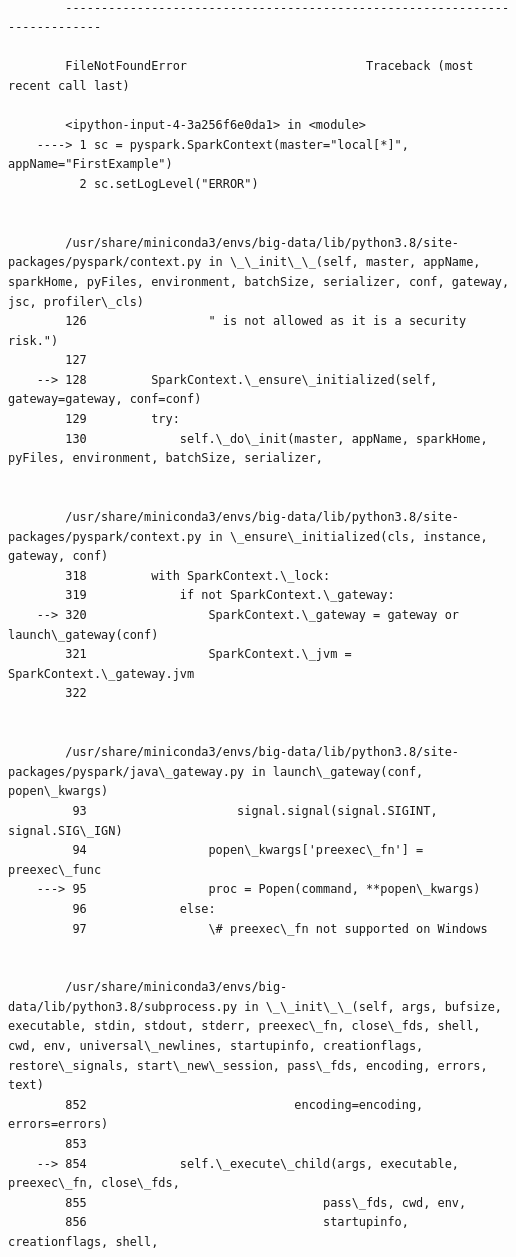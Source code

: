\documentclass[11pt]{article}
\begin{document}
    \begin{Verbatim}[commandchars=\\\{\}]

        ---------------------------------------------------------------------------

        FileNotFoundError                         Traceback (most recent call last)

        <ipython-input-4-3a256f6e0da1> in <module>
    ----> 1 sc = pyspark.SparkContext(master="local[*]", appName="FirstExample")
          2 sc.setLogLevel("ERROR")


        /usr/share/miniconda3/envs/big-data/lib/python3.8/site-packages/pyspark/context.py in \_\_init\_\_(self, master, appName, sparkHome, pyFiles, environment, batchSize, serializer, conf, gateway, jsc, profiler\_cls)
        126                 " is not allowed as it is a security risk.")
        127 
    --> 128         SparkContext.\_ensure\_initialized(self, gateway=gateway, conf=conf)
        129         try:
        130             self.\_do\_init(master, appName, sparkHome, pyFiles, environment, batchSize, serializer,


        /usr/share/miniconda3/envs/big-data/lib/python3.8/site-packages/pyspark/context.py in \_ensure\_initialized(cls, instance, gateway, conf)
        318         with SparkContext.\_lock:
        319             if not SparkContext.\_gateway:
    --> 320                 SparkContext.\_gateway = gateway or launch\_gateway(conf)
        321                 SparkContext.\_jvm = SparkContext.\_gateway.jvm
        322 


        /usr/share/miniconda3/envs/big-data/lib/python3.8/site-packages/pyspark/java\_gateway.py in launch\_gateway(conf, popen\_kwargs)
         93                     signal.signal(signal.SIGINT, signal.SIG\_IGN)
         94                 popen\_kwargs['preexec\_fn'] = preexec\_func
    ---> 95                 proc = Popen(command, **popen\_kwargs)
         96             else:
         97                 \# preexec\_fn not supported on Windows


        /usr/share/miniconda3/envs/big-data/lib/python3.8/subprocess.py in \_\_init\_\_(self, args, bufsize, executable, stdin, stdout, stderr, preexec\_fn, close\_fds, shell, cwd, env, universal\_newlines, startupinfo, creationflags, restore\_signals, start\_new\_session, pass\_fds, encoding, errors, text)
        852                             encoding=encoding, errors=errors)
        853 
    --> 854             self.\_execute\_child(args, executable, preexec\_fn, close\_fds,
        855                                 pass\_fds, cwd, env,
        856                                 startupinfo, creationflags, shell,



\end{Verbatim}
\end{document}
